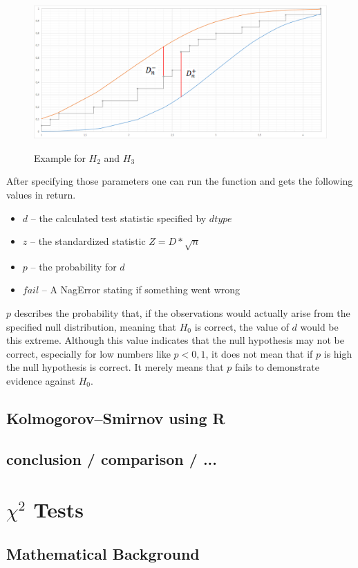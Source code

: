 \documentclass{article}
\begin{document}
\begin{figure}[here]
\caption{Example for $H_2$ and $H_3$}
\center
\includegraphics[width=.99\textwidth]{figures/diagramKSd-d+.png}
\label{fig:2}
\end{figure}
\newpage

After specifying those parameters one can run the function and gets the following values in return.
\begin{itemize}
\item $d$ -- the calculated test statistic specified by $dtype$
\item $z$ -- the standardized  statistic $Z=D*\sqrt n$
\item $p$ -- the probability for $d$
\item $fail$ -- A NagError stating if something went wrong
\end{itemize}
$p$ describes the probability that, if the observations would actually arise from the specified null distribution, meaning that $H_0$ is correct, the value of $d$ would be this extreme. Although this value indicates that the null hypothesis may not be correct, especially for low numbers like $p<0,1$, it does not mean that if $p$ is high the null hypothesis is correct. It merely means that $p$ fails to demonstrate evidence against $H_0$.

\subsection{Kolmogorov–Smirnov using R}
\subsection{conclusion / comparison / ...}


\section{$\chi^2$ Tests}
\subsection{Mathematical Background}
\end{document}
